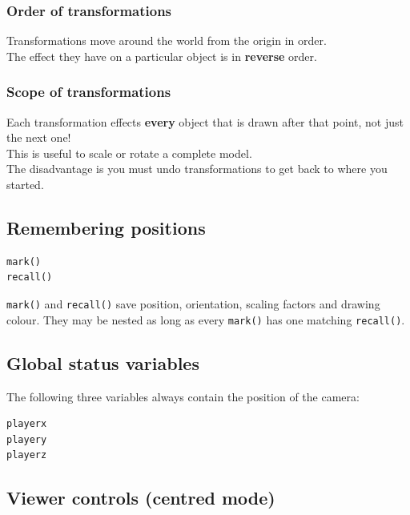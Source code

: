\documentclass[12pt,a4paper,twoside]{article}
\renewcommand{\_}{\texttt{\symbol{95}}}
\begin{document}
\subsubsection*{Order of transformations}

Transformations move around the world from the origin in order.\\
The effect they have on a particular object is in \textbf{reverse} order.\\

\subsubsection*{Scope of transformations}

Each transformation effects \textbf{every} object that is drawn after
that point, not just the next one!\\
This is useful to scale or rotate a complete model.\\
The disadvantage is you must undo transformations to get back to where
you started.\\

\subsection{Remembering positions}

\begin{verbatim}
mark()
recall()
\end{verbatim}

\verb^mark()^ and \verb^recall()^ save position, orientation,
scaling factors and drawing colour. They may be nested as long as
every \verb^mark()^ has one matching \verb^recall()^.\\


\subsection{Global status variables}

The following three variables always contain the position of the camera:

\begin{verbatim}
playerx
playery
playerz
\end{verbatim}

\subsection{Viewer controls (centred mode)}
\end{document}
